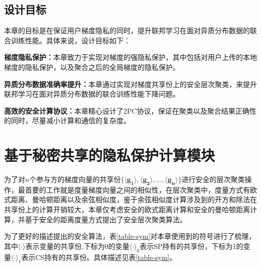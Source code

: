 \subsection{设计目标}
本章的目标是在保证用户梯度隐私的同时，提升联邦学习在面对异质分布数据的联合训练性能。具体来说，设计目标如下：
\begin{compactitem}
    \item \textbf{梯度隐私保护：}本章致力于实现对梯度的强隐私保护，其中包括对用户上传的本地梯度的隐私保护，以及聚合之后的全局梯度的隐私保护。
    \item \textbf{异质分布数据准确率提升：}本章通过实现对梯度共享份上的安全层次聚类，来提升联邦学习在面对异质分布数据的联合训练性能下降问题。
    \item \textbf{高效的安全计算协议：}本章精心设计了2PC协议，保证在聚类以及聚合结果正确性的同时，尽量减小计算和通信的复杂度。
\end{compactitem}

\section{基于秘密共享的隐私保护计算模块}\label{4-building}
为了对$n$个参与方的梯度向量的共享份$\{\boldsymbol{\langle g_1\rangle}, \boldsymbol{\langle g_2\rangle},...,\boldsymbol{\langle g_n\rangle} \}$进行安全的层次聚类操作，最首要的工作就是度量梯度向量之间的相似性，在层次聚类中，度量方式有欧式距离、曼哈顿距离以及余弦相似度，鉴于余弦相似度计算涉及到的开方和除法在共享份上的计算开销较大，本章仅考虑安全的欧式距离计算和安全的曼哈顿距离计算，并基于安全的距离度量方式提出了安全层次聚类算法。

为了更好的描述提出的安全算法，表\ref{table-sym}对本章使用到的符号进行了梳理，其中$\langle \cdot\rangle$表示变量的共享份,下标为0的变量$\langle \cdot\rangle_0$表示SP持有的共享份，下标为1的变量$\langle \cdot\rangle_1$表示CS持有的共享份。具体描述见表\ref{table-sym}。

